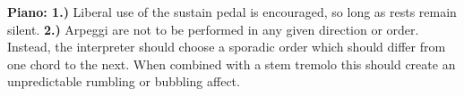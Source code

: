 \documentclass[12pt]{article}
\begin{document}
\begingroup
\textbf{Piano: 1.)} Liberal use of the sustain pedal is encouraged, so long as rests remain silent. \textbf{2.)} Arpeggi are not to be performed in any given direction or order. Instead, the interpreter should choose a sporadic order which should differ from one chord to the next. When combined with a stem tremolo this should create an unpredictable rumbling or bubbling affect. \\
\endgroup
\end{document}
